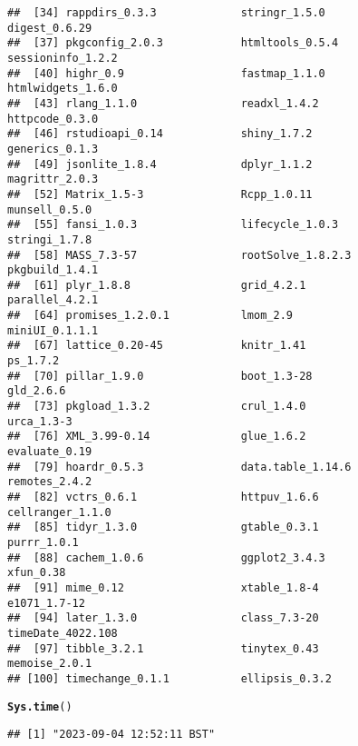 \documentclass{article}\usepackage[]{graphicx}\usepackage[]{xcolor}
\makeatletter
\newcommand{\hlstd}[1]{\textcolor[rgb]{0.345,0.345,0.345}{#1}}%
\newcommand{\hlkwd}[1]{\textcolor[rgb]{0.737,0.353,0.396}{\textbf{#1}}}%
\newenvironment{kframe}{%
 \def\at@end@of@kframe{}%
 \ifinner\ifhmode%
  \def\at@end@of@kframe{\end{minipage}}%
  \begin{minipage}{\columnwidth}%
 \fi\fi%
 \def\FrameCommand##1{\hskip\@totalleftmargin \hskip-\fboxsep
 \colorbox{shadecolor}{##1}\hskip-\fboxsep
     \hskip-\linewidth \hskip-\@totalleftmargin \hskip\columnwidth}%
 \MakeFramed {\advance\hsize-\width
   \@totalleftmargin\z@ \linewidth\hsize
   \@setminipage}}%
 {\par\unskip\endMakeFramed%
 \at@end@of@kframe}
\newenvironment{knitrout}{}{} %
\makeatother
\begin{document}
\begin{knitrout}
\begin{kframe}
\begin{verbatim}
##  [34] rappdirs_0.3.3             stringr_1.5.0              digest_0.6.29             
##  [37] pkgconfig_2.0.3            htmltools_0.5.4            sessioninfo_1.2.2         
##  [40] highr_0.9                  fastmap_1.1.0              htmlwidgets_1.6.0         
##  [43] rlang_1.1.0                readxl_1.4.2               httpcode_0.3.0            
##  [46] rstudioapi_0.14            shiny_1.7.2                generics_0.1.3            
##  [49] jsonlite_1.8.4             dplyr_1.1.2                magrittr_2.0.3            
##  [52] Matrix_1.5-3               Rcpp_1.0.11                munsell_0.5.0             
##  [55] fansi_1.0.3                lifecycle_1.0.3            stringi_1.7.8             
##  [58] MASS_7.3-57                rootSolve_1.8.2.3          pkgbuild_1.4.1            
##  [61] plyr_1.8.8                 grid_4.2.1                 parallel_4.2.1            
##  [64] promises_1.2.0.1           lmom_2.9                   miniUI_0.1.1.1            
##  [67] lattice_0.20-45            knitr_1.41                 ps_1.7.2                  
##  [70] pillar_1.9.0               boot_1.3-28                gld_2.6.6                 
##  [73] pkgload_1.3.2              crul_1.4.0                 urca_1.3-3                
##  [76] XML_3.99-0.14              glue_1.6.2                 evaluate_0.19             
##  [79] hoardr_0.5.3               data.table_1.14.6          remotes_2.4.2             
##  [82] vctrs_0.6.1                httpuv_1.6.6               cellranger_1.1.0          
##  [85] tidyr_1.3.0                gtable_0.3.1               purrr_1.0.1               
##  [88] cachem_1.0.6               ggplot2_3.4.3              xfun_0.38                 
##  [91] mime_0.12                  xtable_1.8-4               e1071_1.7-12              
##  [94] later_1.3.0                class_7.3-20               timeDate_4022.108         
##  [97] tibble_3.2.1               tinytex_0.43               memoise_2.0.1             
## [100] timechange_0.1.1           ellipsis_0.3.2
\end{verbatim}
\begin{alltt}
\hlkwd{Sys.time}\hlstd{()}
\end{alltt}
\begin{verbatim}
## [1] "2023-09-04 12:52:11 BST"
\end{verbatim}
\end{kframe}
\end{knitrout}
\end{document}

